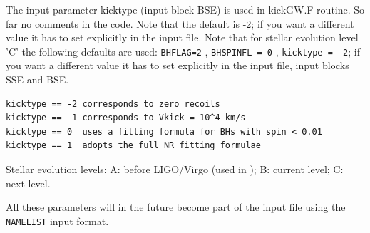 The input parameter kicktype (input block BSE) is used in kickGW.F routine. So far no comments in the code. Note that the default is -2; if you want a different value it has to set explicitly in the input file. Note that for stellar evolution level 'C' the following defaults are used:  \texttt{BHFLAG=2} , \texttt{BHSPINFL = 0} , \texttt{kicktype = -2}; if you want a different value it has to set explicitly in the input file, input blocks SSE and BSE.

\begin{lstlisting}
kicktype == -2 corresponds to zero recoils
kicktype == -1 corresponds to Vkick = 10^4 km/s
kicktype == 0  uses a fitting formula for BHs with spin < 0.01
kicktype == 1  adopts the full NR fitting formulae
\end{lstlisting}

Stellar evolution levels: A: before LIGO/Virgo (used in \cite{Wang2016}); B: current level; C: next level. 

All these parameters will in the future become part of the input file using the \texttt{NAMELIST} input format.


\begingroup
	
	\setlength{\tabcolsep}{8.0pt} %
	\renewcommand{\arraystretch}{1.31} %
	
